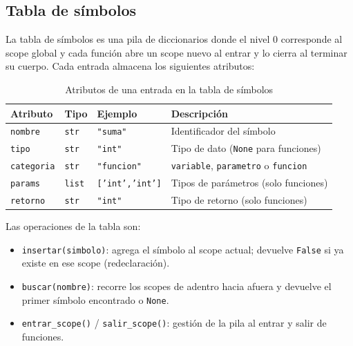 \documentclass[12pt]{article}
\begin{document}
\subsection{Tabla de símbolos}

La tabla de símbolos es una pila de diccionarios donde el nivel 0
corresponde al scope global y cada función abre un scope nuevo al
entrar y lo cierra al terminar su cuerpo. Cada entrada almacena
los siguientes atributos:

\begin{table}[H]
\centering
\renewcommand{\arraystretch}{1.2}
\begin{tabular}{@{}p{2.8cm} p{2.4cm} p{3.2cm} p{4.6cm}@{}}
\toprule
\textbf{Atributo} & \textbf{Tipo} & \textbf{Ejemplo} & \textbf{Descripción} \\
\midrule
\texttt{nombre}    & \texttt{str}  & \texttt{"suma"}
    & Identificador del símbolo \\
\texttt{tipo}      & \texttt{str}  & \texttt{"int"}
    & Tipo de dato (\texttt{None} para funciones) \\
\texttt{categoria} & \texttt{str}  & \texttt{"funcion"}
    & \texttt{variable}, \texttt{parametro} o \texttt{funcion} \\
\texttt{params}    & \texttt{list} & \texttt{['int','int']}
    & Tipos de parámetros (solo funciones) \\
\texttt{retorno}   & \texttt{str}  & \texttt{"int"}
    & Tipo de retorno (solo funciones) \\
\bottomrule
\end{tabular}
\caption{Atributos de una entrada en la tabla de símbolos}
\end{table}

Las operaciones de la tabla son:

\begin{itemize}
    \item \texttt{insertar(simbolo)}: agrega el símbolo al scope
          actual; devuelve \texttt{False} si ya existe en ese scope
          (redeclaración).
    \item \texttt{buscar(nombre)}: recorre los scopes de adentro
          hacia afuera y devuelve el primer símbolo encontrado
          o \texttt{None}.
    \item \texttt{entrar\_scope()} / \texttt{salir\_scope()}:
          gestión de la pila al entrar y salir de funciones.
\end{itemize}

\end{document}
